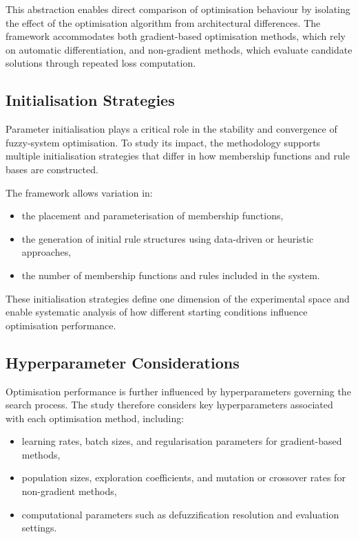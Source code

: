 \documentclass[a4paper,12pt,oneside]{article}
\begin{document}
This abstraction enables direct comparison of optimisation behaviour by isolating the effect of the optimisation algorithm from architectural differences. The framework accommodates both gradient-based optimisation methods, which rely on automatic differentiation, and non-gradient methods, which evaluate candidate solutions through repeated loss computation.

\subsection{Initialisation Strategies}

Parameter initialisation plays a critical role in the stability and convergence of fuzzy-system optimisation. To study its impact, the methodology supports multiple initialisation strategies that differ in how membership functions and rule bases are constructed.

The framework allows variation in:
\begin{itemize}
    \item the placement and parameterisation of membership functions,
    \item the generation of initial rule structures using data-driven or heuristic approaches,
    \item the number of membership functions and rules included in the system.
\end{itemize}

These initialisation strategies define one dimension of the experimental space and enable systematic analysis of how different starting conditions influence optimisation performance.

\subsection{Hyperparameter Considerations}

Optimisation performance is further influenced by hyperparameters governing the search process. The study therefore considers key hyperparameters associated with each optimisation method, including:
\begin{itemize}
    \item learning rates, batch sizes, and regularisation parameters for gradient-based methods,
    \item population sizes, exploration coefficients, and mutation or crossover rates for non-gradient methods,
    \item computational parameters such as defuzzification resolution and evaluation settings.
\end{itemize}
\end{document}
